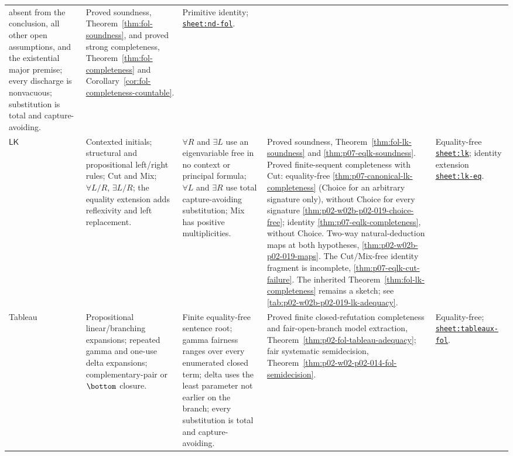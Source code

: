 \begin{landscape}
\begin{longtable}{@{}p{.65in}p{1.35in}p{1.95in}p{1.90in}p{1.25in}@{}}
absent from the conclusion, all other open assumptions, and the existential
major premise; every discharge is nonvacuous; substitution is total and
capture-avoiding. & Proved soundness,
Theorem~\ref{thm:fol-soundness}, and proved strong completeness,
Theorem~\ref{thm:fol-completeness} and
Corollary~\ref{cor:fol-completeness-countable}. & Primitive identity;
\hyperref[sheet:nd-fol]{\texttt{sheet:nd-fol}}. \\
\(\mathsf{LK}\) & Contexted initials; structural and propositional left/right
rules; Cut and Mix; \(\forall L/R\), \(\exists L/R\); the equality extension
adds reflexivity and left replacement. & \(\forall R\) and \(\exists L\) use
an eigenvariable free in no context or principal formula; \(\forall L\) and
\(\exists R\) use total capture-avoiding substitution; Mix has positive
multiplicities. & Proved soundness, Theorem~\ref{thm:fol-lk-soundness} and
\cref{thm:p07-eqlk-soundness}.  Proved finite-sequent completeness with
Cut: equality-free \cref{thm:p07-canonical-lk-completeness} (Choice for an
arbitrary signature only), without Choice for every signature
\cref{thm:p02-w02b-p02-019-choice-free}; identity
\cref{thm:p07-eqlk-completeness}, without Choice.  Two-way natural-deduction
maps at both hypotheses, \cref{thm:p02-w02b-p02-019-maps}.  The Cut/Mix-free
identity fragment is incomplete, \cref{thm:p07-eqlk-cut-failure}.  The
inherited Theorem~\ref{thm:fol-lk-completeness} remains a sketch; see
\cref{tab:p02-w02b-p02-019-lk-adequacy}. & Equality-free
\hyperref[sheet:lk]{\texttt{sheet:lk}}; identity extension
\hyperref[sheet:lk-eq]{\texttt{sheet:lk-eq}}. \\
Tableau & Propositional linear/branching expansions; repeated gamma and
one-use delta expansions; complementary-pair or \(\bottom\) closure. & Finite
equality-free sentence root; gamma fairness ranges over every enumerated
closed term; delta uses the least parameter not earlier on the branch; every
substitution is total and capture-avoiding. & Proved finite closed-refutation
completeness and fair-open-branch model extraction,
Theorem~\ref{thm:p02-fol-tableau-adequacy}; fair systematic semidecision,
Theorem~\ref{thm:p02-w02-p02-014-fol-semidecision}. & Equality-free;
\hyperref[sheet:tableaux-fol]{\texttt{sheet:tableaux-fol}}. \\
\bottomrule
\end{longtable}
\endgroup
\end{landscape}

